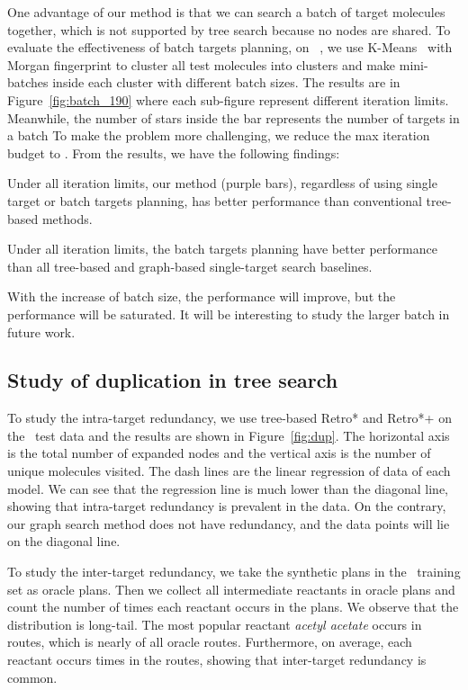 \documentclass[sigconf]{acmart}
\begin{document}
One advantage of our method is that we can search a batch of target molecules together, which is not supported by tree search because no nodes are shared.
To evaluate the effectiveness of batch targets planning, on \uspto~, we use K-Means~\citep{lloyd1982} with Morgan fingerprint to cluster all test molecules into  clusters and make mini-batches inside each cluster with different batch sizes.
The results are in Figure~\ref{fig:batch_190} where each sub-figure represent different iteration limits.
Meanwhile, the number of stars inside the bar represents the number of targets in a batch
To make the problem more challenging, we reduce the max iteration budget to .
From the results, we have the following findings:

\noindent Under all iteration limits, our method (purple bars), regardless of using single target or batch targets planning, has better performance than conventional tree-based methods.

\noindent Under all iteration limits, the batch targets planning have better performance than all tree-based and graph-based single-target search baselines.

\noindent With the increase of batch size, the performance will improve, but the performance will be saturated. It will be interesting to study the larger batch in future work.



\subsection{Study of duplication in tree search}\label{sec:res_study}
To study the intra-target redundancy, we use tree-based Retro* and Retro*+ on the \uspto~test data and the results are shown in Figure~\ref{fig:dup}.
The horizontal axis is the total number of expanded nodes and the vertical  axis is the number of unique molecules visited.
The dash lines are the linear regression of data of each model.
We can see that the regression line is much lower than the diagonal line, showing that intra-target redundancy is prevalent in the data.
On the contrary, our graph search method does not have redundancy, and the data points will lie on the diagonal line.



To study the inter-target redundancy, we take the synthetic plans in the \uspto~training set as oracle plans.
Then we collect all intermediate reactants in oracle plans and count the number of times each reactant occurs in the plans. 
We observe that the distribution is long-tail. The most popular reactant \textit{acetyl acetate} occurs in  routes, which is nearly  of all oracle routes.
Furthermore, on average, each reactant occurs  times in the routes, showing that inter-target redundancy is common.
\end{document}
